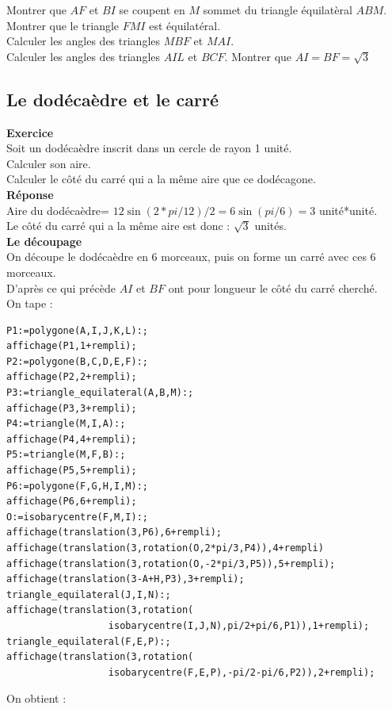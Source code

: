 \documentclass[a4paper,11pt]{book}
\begin{document}
Montrer que $AF$ et $BI$ se coupent en $M$ sommet du triangle \'equilat\`eral 
$ABM$.\\
Montrer que le triangle $FMI$ est \'equilat\'eral.\\
Calculer les angles des triangles $MBF$ et $MAI$.\\
Calculer les angles des triangles $AIL$ et $BCF$.
Montrer que $AI=BF=\sqrt 3$\\
\subsection{Le dod\'eca\`edre et le carr\'e}
{\bf Exercice}\\
Soit un dod\'eca\`edre inscrit dans un cercle de rayon 1 unit\'e.\\
Calculer son aire.\\
Calculer le c\^ot\'e du carr\'e qui a la m\^eme aire que ce dod\'ecagone.\\
{\bf R\'eponse}\\
Aire du dod\'eca\`edre= $12\sin(2*pi/12)/2=6\sin(pi/6)=3$ unit\'e*unit\'e.\\
Le c\^ot\'e du carr\'e qui a la m\^eme aire est donc : $\sqrt 3$ unit\'es.\\
{\bf Le d\'ecoupage}\\
On d\'ecoupe le dod\'eca\`edre en 6 morceaux, puis on forme un carr\'e avec 
ces 6 morceaux.\\
D'apr\`es ce qui pr\'ec\`ede $AI$ et $BF$ ont pour longueur le c\^ot\'e du 
carr\'e cherch\'e.\\
On tape :
\begin{verbatim}
P1:=polygone(A,I,J,K,L):;
affichage(P1,1+rempli);
P2:=polygone(B,C,D,E,F):;
affichage(P2,2+rempli);
P3:=triangle_equilateral(A,B,M):;
affichage(P3,3+rempli);
P4:=triangle(M,I,A):;
affichage(P4,4+rempli);
P5:=triangle(M,F,B):;
affichage(P5,5+rempli);
P6:=polygone(F,G,H,I,M):;
affichage(P6,6+rempli);
O:=isobarycentre(F,M,I):;
affichage(translation(3,P6),6+rempli);
affichage(translation(3,rotation(O,2*pi/3,P4)),4+rempli)
affichage(translation(3,rotation(O,-2*pi/3,P5)),5+rempli);
affichage(translation(3-A+H,P3),3+rempli);
triangle_equilateral(J,I,N):;
affichage(translation(3,rotation(
                  isobarycentre(I,J,N),pi/2+pi/6,P1)),1+rempli);
triangle_equilateral(F,E,P):;
affichage(translation(3,rotation(
                  isobarycentre(F,E,P),-pi/2-pi/6,P2)),2+rempli);
\end{verbatim}
On obtient :\\
\end{document}
